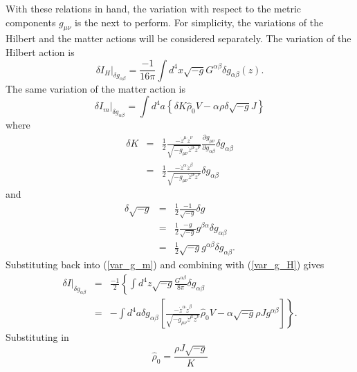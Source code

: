 With these relations in hand, the variation with respect to the metric components $g_{\mu \nu}$ is the next to perform.  For simplicity, the variations of the Hilbert and the matter actions will be considered separately.  The variation of the Hilbert action is
\begin{equation}\label{var_g_H}
\delta I_{H} \vert_{\delta g_{\alpha \beta}} = \frac{-1}{16 \pi} \int \! d^4x \sqrt{-g} G^{\alpha \beta} \delta g_{\alpha \beta}(z).
\end{equation}
The same variation of the matter action is
\begin{equation}\label{var_g_m}
\delta I_{m} \vert_{\delta g_{\alpha \beta}} = \int \! d^4a
	\left\{
		\delta K {\hat \rho}_{0} V 
		- \alpha \rho \delta \sqrt{-g} J
	\right\}
\end{equation}
where
\begin{eqnarray}
\delta K 
	& = &
		\frac{1}{2} \frac{ - \dot z^{\mu} 
		\dot z^{\nu}}{\sqrt{ -g_{\mu \nu} \dot z^{\mu} \dot z^{\nu}}} 
		\frac{\partial g_{\mu \nu}}{\partial g_{\alpha \beta}} \delta 
		g_{\alpha \beta} \nonumber \\
	& = &	
		\frac{1}{2} \frac{ - \dot z^{\alpha} 
		\dot z^{\beta}}{\sqrt{ -g_{\mu \nu} \dot z^{\mu} \dot z^{\nu}}} 
		\delta g_{\alpha \beta}
\end{eqnarray}
and
\begin{eqnarray}
\delta \sqrt{-g}
	& = &
		\frac{1}{2} \frac{-1}{\sqrt{-g}} \delta g \nonumber \\
	& = &
		\frac{1}{2} \frac{-g}{\sqrt{-g}} g^{\beta \alpha} \delta g_{\alpha 
		\beta} \nonumber \\
	& = &
		\frac{1}{2} \sqrt{-g} g^{\alpha \beta} \delta g_{\alpha 
		\beta}.
\end{eqnarray}
Substituting back into (\ref{var_g_m}) and combining with (\ref{var_g_H}) gives
\begin{eqnarray}
\delta I \vert_{\delta g_{\alpha \beta}} 
	& = & 
		\frac{-1}{2} 
		\left\{
			 \int d^4z \sqrt{-g} \frac{G^{\alpha \beta}}
			{8 \pi} \delta g_{\alpha \beta} 
		\right. \nonumber \\
	& = & 
		- \int d^4a \delta g_{\alpha \beta}
		\left.
 		\left[
			 \frac{ - \dot z^{\alpha} \dot z^{\beta}               }
			      { \sqrt{ -g_{\mu \nu} \dot z^{\mu} \dot z^{\nu}} } 
			 {\hat \rho}_{0} V - \alpha \sqrt{-g} \rho J g^{\alpha \beta}
 		\right]
		\right\}.
\end{eqnarray}
Substituting in
\begin{equation}
{\hat \rho}_{0} = \frac{\rho J \sqrt{-g}}{K}
\end{equation}
